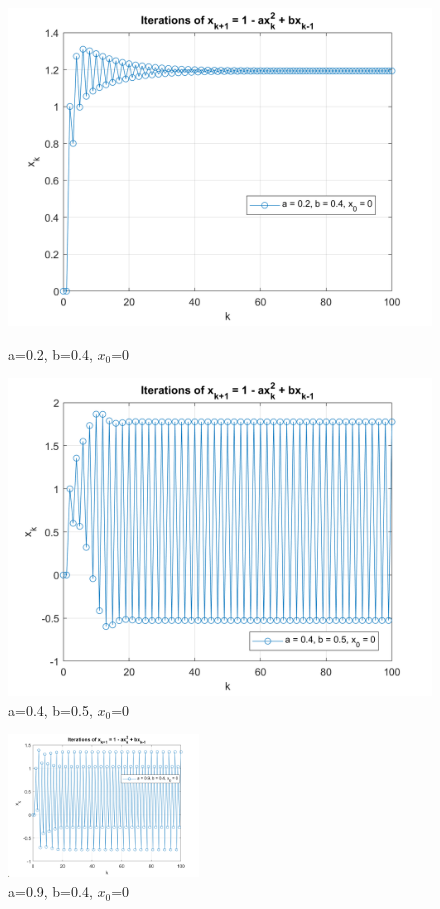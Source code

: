 \documentclass{article}
\begin{document}
\begin{enumerate} [label=\Alph*]
  \begin{figure}[h]
    \centering
    \begin{minipage}[t]{0.5\textwidth}
      \centering
      \includegraphics[width=0.8\linewidth]{Problem3_D_1.png}
      \caption{a=0.2, b=0.4, $x_0$=0} 
      \label{fig:img1}
    \end{minipage}%
    \begin{minipage}[t]{0.5\textwidth}
      \centering
      \includegraphics[width=0.8\linewidth]{Problem3_D_2.png}
      \caption{a=0.4, b=0.5, $x_0$=0}
      \label{fig:img2}
    \end{minipage}
  \end{figure}
  \begin{figure}[H]
    \centering
    \includegraphics[width=0.45\textwidth]{Problem3_D_3.png}
    \caption{a=0.9, b=0.4, $x_0$=0}
    \label{fig:a2}
  \end{figure}
\end{enumerate}
\end{document}
